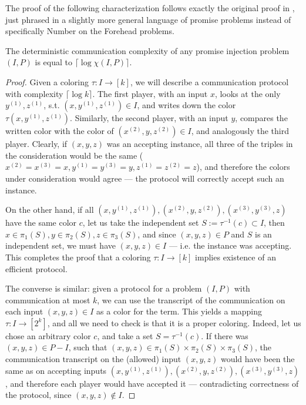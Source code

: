 The proof of the following characterization follows exactly the original proof in \cite{CFL83}, just phrased in a slightly more general language of promise problems instead of specifically Number on the Forehead problems.

\begin{theorem}
\label{thm:coloring-is-communication}
The deterministic communication complexity of any promise injection problem $(I, P)$ is equal to $\lceil \log \chi(I,P) \rceil$.
\end{theorem}
\begin{proof}
Given a coloring $\tau : I \to [k]$, we will describe a communication protocol with complexity $\lceil \log k \rceil$. The first player, with an input $x$, looks at the only $y^{(1)},z^{(1)}$, s.t. $(x,y^{(1)},z^{(1)}) \in I$, and writes down the color $\tau(x,y^{(1)},z^{(1)})$. Similarly, the second player, with an input $y$, compares the written color with the color of $(x^{(2)}, y, z^{(2)}) \in I$, and analogously the third player. Clearly, if $(x,y,z)$ was an accepting instance, all three of the triples in the consideration would be the same ($x^{(2)} = x^{(3)} = x, y^{(1)} = y^{(3)} = y, z^{(1)} = z^{(2)} = z$), and therefore the colors under consideration would agree --- the protocol will correctly accept such an instance.

On the other hand, if all $(x, y^{(1)}, z^{(1)}), (x^{(2)}, y, z^{(2)}), (x^{(3)}, y^{(3)}, z)$ have the same color $c$, let us take the independent set $S := \tau^{-1}(c) \subset I$, then $x \in \pi_1(S), y \in \pi_2(S), z \in \pi_3(S)$, and since $(x,y,z) \in P$ and $S$ is an independent set, we  must have $(x,y,z) \in I$ --- i.e. the instance was accepting. This completes the proof that a coloring $\tau : I \to [k]$ implies existence of an efficient protocol.

The converse is similar: given a protocol for a problem $(I, P)$ with communication at most $k$, we can use the transcript of the communication on each input $(x,y,z) \in I$ as a color for the term. This yields a mapping $\tau : I \to [2^k]$, and all we need to check is that it is a proper coloring. Indeed, let us chose an arbitrary color $c$, and take a set $S = \tau^{-1}(c)$. If there was $(x, y, z) \in P - I$, such that $(x, y, z) \in \pi_1(S) \times \pi_2(S) \times \pi_3(S)$, the communication transcript on the (allowed) input $(x,y,z)$ would have been the same as on accepting inputs $(x, y^{(1)}, z^{(1)}), (x^{(2)}, y, z^{(2)}), (x^{(3)}, y^{(3)}, z)$, and therefore each player would have accepted it --- contradicting correctness of the protocol, since $(x,y,z) \not\in I$.
\end{proof}

